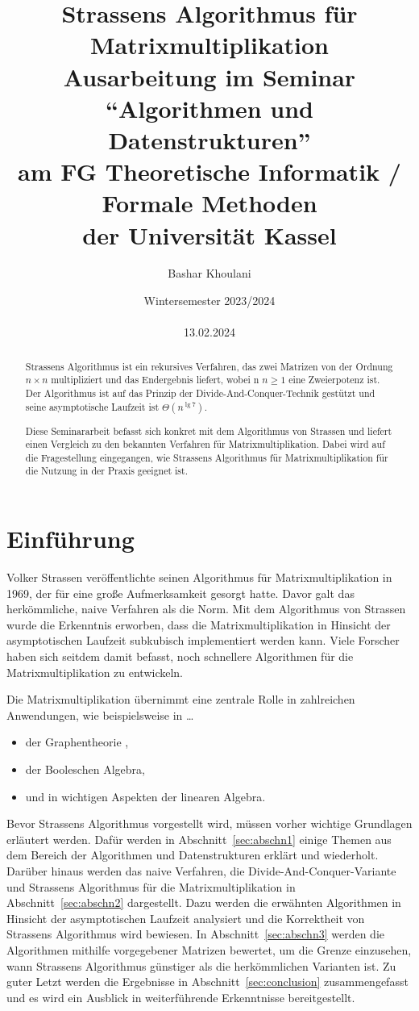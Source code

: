 \documentclass[11pt]{article}
\title{Strassens Algorithmus für Matrixmultiplikation \\[3 mm] \large Ausarbeitung im Seminar \enquote{Algorithmen und Datenstrukturen} \\ am FG Theoretische Informatik / Formale Methoden \\ der Universit\"at Kassel}
\author{Bashar Khoulani}
\date{Wintersemester 2023/2024 \\ \phantom{a} \\ 13.02.2024}
\numberwithin{equation}{section}
\theoremstyle{definition}
\theoremstyle{definition}
\theoremstyle{definition}
\theoremstyle{definition}
\theoremstyle{definition}
\begin{document}
\maketitle

\begin{abstract}
Strassens Algorithmus ist ein rekursives Verfahren, das zwei Matrizen von der Ordnung $n \times n$ multipliziert und das Endergebnis liefert, wobei n $n \geq 1$ eine Zweierpotenz ist. 
Der Algorithmus ist auf das Prinzip der Divide-And-Conquer-Technik gestützt und seine asymptotische Laufzeit ist $\Theta(n^{\lg7})$.

Diese Seminararbeit befasst sich konkret mit dem Algorithmus von Strassen und liefert einen Vergleich zu den bekannten Verfahren für Matrixmultiplikation.
Dabei wird auf die Fragestellung eingegangen, wie Strassens Algorithmus für Matrixmultiplikation für die Nutzung in der Praxis geeignet ist.
\end{abstract}

\section{Einführung}\label{sec:einfuhrung}

Volker Strassen veröffentlichte seinen Algorithmus für Matrixmultiplikation in 1969\cite{Strassen1969}, der für eine große Aufmerksamkeit gesorgt hatte.
Davor galt das herkömmliche, naive Verfahren als die Norm.
Mit dem Algorithmus von Strassen wurde die Erkenntnis erworben, dass die Matrixmultiplikation in Hinsicht der asymptotischen Laufzeit subkubisch implementiert werden kann.
Viele Forscher haben sich seitdem damit befasst, noch schnellere Algorithmen für die Matrixmultiplikation zu entwickeln. 

Die Matrixmultiplikation übernimmt eine zentrale Rolle in zahlreichen Anwendungen,
wie beispielsweise in \ldots 
\begin{itemize}
    \item der Graphentheorie \cite{4569672},
    \item der Booleschen Algebra\cite{4569672, 1984},
    \item und in wichtigen Aspekten der linearen Algebra\cite{1984}.
\end{itemize}

Bevor Strassens Algorithmus vorgestellt wird, müssen vorher wichtige Grundlagen erläutert werden.
Dafür werden in Abschnitt~\ref{sec:abschn1} einige Themen aus dem Bereich der Algorithmen und Datenstrukturen erklärt und wiederholt.
Darüber hinaus werden das naive Verfahren, die Divide-And-Conquer-Variante und Strassens Algorithmus für die Matrixmultiplikation in Abschnitt~\ref{sec:abschn2} dargestellt.
Dazu werden die erwähnten Algorithmen in Hinsicht der asymptotischen Laufzeit analysiert und die Korrektheit von Strassens Algorithmus wird bewiesen.
In Abschnitt~\ref{sec:abschn3} werden die Algorithmen mithilfe vorgegebener Matrizen bewertet, um die Grenze einzusehen, wann Strassens Algorithmus günstiger als die herkömmlichen Varianten ist.
Zu guter Letzt werden die Ergebnisse in Abschnitt~\ref{sec:conclusion} zusammengefasst und es wird ein Ausblick in weiterführende Erkenntnisse bereitgestellt.
 
\end{document}
